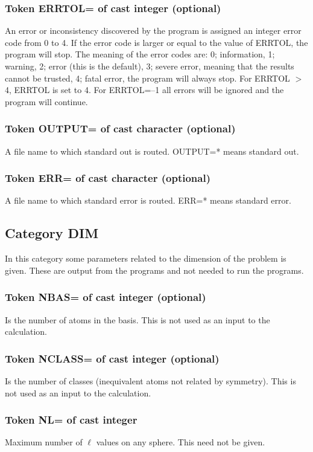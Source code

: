 \documentclass[aps,twocolumn,a4]{revtex4}
\begin{document}
\subsubsection{Token ERRTOL= of cast integer (optional)}
An error or inconsistency discovered by the program is assigned an
integer error code from 0 to 4. If the error code is larger or
equal to the value of ERRTOL, the program will stop. The meaning of the
error codes are: 0; information, 1; warning, 2; error (this is the
default), 3; severe error, meaning that the results cannot be trusted,
4; fatal error, the program will always stop. For ERRTOL $>$ 4, ERRTOL
is set to 4. For ERRTOL=--1 all errors will be ignored and the program
will continue.

\subsubsection{Token OUTPUT= of cast character (optional)}
A file name to which standard out is routed. OUTPUT=* means standard
out.

\subsubsection{Token ERR= of cast character (optional)}
A file name to which standard error is routed.
ERR=* means standard error.

\subsection{Category DIM}
In this category some parameters related to the dimension of the
problem is given. These are output from the programs and not needed to
run the programs.

\subsubsection{Token NBAS= of cast integer (optional)}
Is the number of atoms in the basis. This is not used as an input
to the calculation.

\subsubsection{Token NCLASS= of cast integer (optional)}
Is the number of classes (inequivalent atoms not related by symmetry).
This is not used as an input to the calculation.

\subsubsection{Token NL= of cast integer}
Maximum number of $\ell $ values on any sphere. This need not be given.
\end{document}
